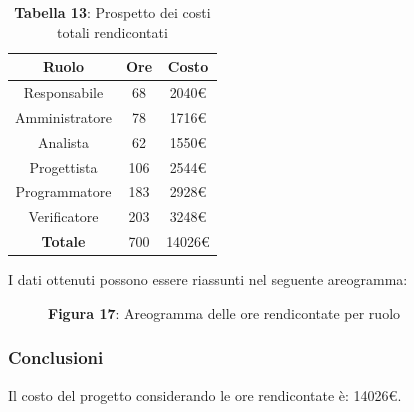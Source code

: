 \begin{table}[H]
	\centering
	\renewcommand{\arraystretch}{1.5}
	\begin{tabular}{|c|c|c|}
		\hline
		\rowcolor{lighter-grayer}
Ruolo & Ore & Costo \\ \hline
Responsabile & 68 & 2040\euro \\ \hline
Amministratore & 78 & 1716\euro \\ \hline
Analista & 62 & 1550\euro \\ \hline
Progettista & 106 & 2544\euro \\ \hline
Programmatore & 183 & 2928\euro \\ \hline
Verificatore & 203 & 3248\euro \\ \hline
\textbf{Totale} & 700 & 14026\euro \\ \hline
	\end{tabular}
	\caption*{\textbf{Tabella 13}: Prospetto dei costi totali rendicontati \\}
\end{table}

I dati ottenuti possono essere riassunti nel seguente areogramma:


\begin{figure}[H]
	\centering
	\caption*{\textbf{Figura 17}: Areogramma delle ore rendicontate per ruolo}
    \label{fig:Figura10}
\end{figure}

\subsubsection{Conclusioni}
Il costo del progetto considerando le ore rendicontate è: 14026\euro.